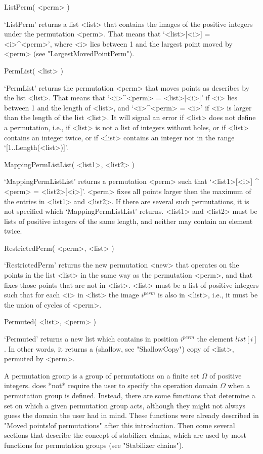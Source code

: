 \>ListPerm( <perm> )

`ListPerm' returns a list <list> that contains the images of the positive
integers  under the permutation   <perm>. That means that  `<list>[<i>] =
<i>^<perm>',  where <i>  lies between 1   and the largest  point moved by
<perm> (see "LargestMovedPointPerm").

\>PermList( <list> )

`PermList' returns the permutation <perm>  that moves points as describes
by the list <list>.  That means that  `<i>^<perm>  = <list>[<i>]' if  <i>
lies between 1 and the length of <list>, and `<i>^<perm> = <i>' if <i> is
larger than  the length of  the list <list>. It will  signal an  error if
<list> does  not define a permutation,  i.e., if <list> is  not a list of
integers  without holes, or  if <list> contains  an  integer twice, or if
<list> contains an integer not in the range `[1..Length(<list>)]'.

\>MappingPermListList( <list1>, <list2> )

`MappingPermListList'    returns   a   permutation    <perm>  such   that
`<list1>[<i>]  ^ <perm> = <list2>[<i>]'.  <perm> fixes  all points larger
then the maximum  of the  entries in <list1>   and <list2>. If  there are
several     such    permutations,  it      is   not     specified   which
`MappingPermListList' returns.   <list1> and  <list2>  must  be  lists of
positive integers of the same length, and neither  may contain an element
twice.

\>RestrictedPerm( <perm>, <list> )

`RestrictedPerm' returns  the new permutation <new>  that operates on the
points in the list <list> in the same  way as the permutation <perm>, and
that fixes those points that are not in <list>.  <list> must be a list of
positive integers  such that for each <i>  in <list> the image $i^{perm}$
is also in <list>, i.e., it must be the union of cycles of <perm>.

\>Permuted( <list>, <perm> )

`Permuted' returns  a new list  which contains in position $i^{perm}$ the
element    $list[i]$.  In other words,       it returns a  (shallow,  see
"ShallowCopy") copy of <list>, permuted by <perm>.


A permutation group is a  group of permutations on  a finite set $\Omega$
of  positive integers. {\GAP} does *not*  require the user to specify the
operation domain  $\Omega$ when a permutation  group is defined. Instead,
there  are   some functions  that  determine  a   set  on  which a  given
permutation group acts, although they  might not always guess the  domain
the user had  in mind. These functions  were already described  in "Moved
points!of  permutations"   after  this introduction.  Then  come  several
sections  that describe the concept of  stabilizer chains, which are used
by most functions for permutation groups (see "Stabilizer chains").

